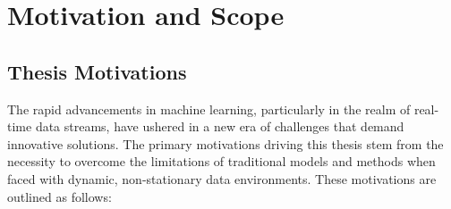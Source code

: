 \section{Motivation and Scope}
\label{sec:1_introduction_motivation}

\subsection{Thesis Motivations}

The rapid advancements in machine learning, particularly in the realm of real-time data streams, have ushered in a new era of challenges that demand innovative solutions. The primary motivations driving this thesis stem from the necessity to overcome the limitations of traditional models and methods when faced with dynamic, non-stationary data environments. These motivations are outlined as follows:
